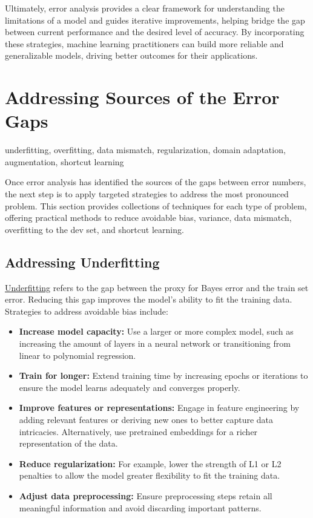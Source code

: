 \documentclass[12pt,openany, draft]{book}
\begin{document}
Ultimately, error analysis provides a clear framework for understanding the limitations of a model and guides iterative improvements, helping bridge the gap between current performance and the desired level of accuracy. By incorporating these strategies, machine learning practitioners can build more reliable and generalizable models, driving better outcomes for their applications.



\section{Addressing Sources of the Error Gaps} \label{sec:addressing_sources_error_gaps}

\begin{keywordsbox}
underfitting, overfitting, data mismatch, regularization, domain adaptation, augmentation, shortcut learning
\end{keywordsbox}

Once error analysis has identified the sources of the gaps between error numbers, the next step is to apply targeted strategies to address the most pronounced problem. This section provides collections of techniques for each type of problem, offering practical methods to reduce avoidable bias, variance, data mismatch, overfitting to the dev set, and shortcut learning.

\subsection{Addressing Underfitting}

\hyperref[subsec:underfitting]{Underfitting} refers to the gap between the proxy for Bayes error and the train set error. Reducing this gap improves the model’s ability to fit the training data. Strategies to address avoidable bias include:

\begin{itemize}
    \item \textbf{Increase model capacity:} Use a larger or more complex model, such as increasing the amount of layers in a neural network or transitioning from linear to polynomial regression.
    \item \textbf{Train for longer:} Extend training time by increasing epochs or iterations to ensure the model learns adequately and converges properly.
    \item \textbf{Improve features or representations:} Engage in feature engineering by adding relevant features or deriving new ones to better capture data intricacies. Alternatively, use pretrained embeddings for a richer representation of the data.
    \item \textbf{Reduce regularization:} For example, lower the strength of L1 or L2 penalties to allow the model greater flexibility to fit the training data.
    \item \textbf{Adjust data preprocessing:} Ensure preprocessing steps retain all meaningful information and avoid discarding important patterns.
\end{itemize}
\end{document}
